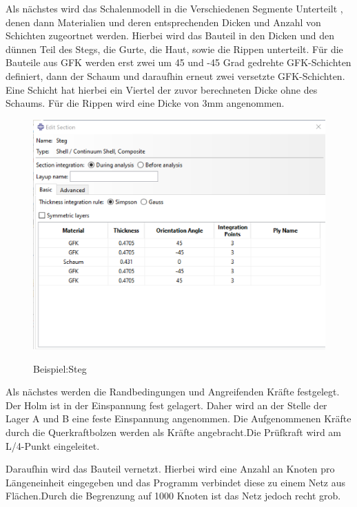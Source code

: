 Als nächstes wird das Schalenmodell in die Verschiedenen Segmente Unterteilt , denen dann Materialien und deren entsprechenden Dicken und Anzahl von Schichten zugeortnet werden. Hierbei wird das Bauteil in den Dicken und den dünnen Teil des Stegs, die Gurte, die Haut, sowie die Rippen unterteilt. Für die Bauteile aus GFK werden erst zwei um 45 und -45 Grad gedrehte GFK-Schichten definiert, dann der Schaum und daraufhin erneut zwei versetzte GFK-Schichten. Eine Schicht hat hierbei ein Viertel der zuvor berechneten Dicke ohne des Schaums. Für die Rippen wird eine Dicke von 3mm angenommen.
\begin{figure}[h]
 \centering
 \includegraphics[scale=0.4]{Bilder/Steg_Material}
 \label{Steg_Material}
 \caption{Beispiel:Steg}
\end{figure}
Als nächstes werden die Randbedingungen und Angreifenden Kräfte festgelegt. Der Holm ist in der Einspannung fest gelagert. Daher wird an der Stelle der Lager A und B eine feste Einspannung angenommen. Die Aufgenommenen Kräfte durch die Querkraftbolzen werden als Kräfte angebracht.Die Prüfkraft wird am L/4-Punkt eingeleitet.

Daraufhin wird das Bauteil vernetzt. Hierbei wird eine Anzahl an Knoten pro Längeneinheit eingegeben und das Programm verbindet diese zu einem Netz aus Flächen.Durch die Begrenzung auf 1000 Knoten ist das Netz jedoch recht grob. \\
\newpage
